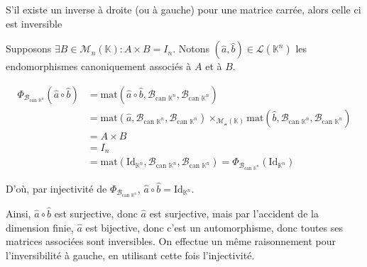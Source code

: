 \documentclass{article}
\date{1 Juillet 2024}
\begin{document}
\maketitle

\begin{question_kholle}
	[Soit $A \in \mathcal{M}_{n}(\mathbb{K})$
	\begin{itemize}
		\item S'il existe $B \in \mathcal{M}_{n}(\mathbb{K}):A\times B = I_{n}$, alors $A\in GL_{n}(\mathbb{K})$ et $A^{-1}=B$
		\item S'il existe $B \in \mathcal{M}_{n}(\mathbb{K}):B \times A = I_{n}$, alors $A\in GL_{n}(\mathbb{K})$ et $A^{-1}=B$
	\end{itemize}
	]
	{S'il existe un inverse à droite (ou à gauche) pour une matrice carrée, alors celle ci est inversible}
	
	
	Supposons $\exists B \in \mathcal{M}_{n}(\mathbb{K}):A\times B = I_{n}$. Notons $(\hat{a}, \hat{b}) \in \mathcal{L}(\mathbb{K}^{n})$ les endomorphismes canoniquement associés à $A$ et à $B$.
	
	
	\begin{align*}
		\Phi_{\mathcal{B}_{\text{can } \mathbb{K}^{n}}}(\hat{a} \circ \hat{b}) &= \mathrm{mat}(\hat{a} \circ  \hat{b}, \mathcal{B}_{\text{can } \mathbb{K}^{n}}, \mathcal{B}_{\text{can } \mathbb{K}^{n}}) \\
		&= \mathrm{mat}(\hat{a}, \mathcal{B}_{\text{can } \mathbb{K}^{n}}, \mathcal{B}_{\text{can } \mathbb{K}^{n}}) \times_{\mathcal{M_{n}(\mathbb{K})}} \mathrm{mat}(\hat{b}, \mathcal{B}_{\text{can } \mathbb{K}^{n}}, \mathcal{B}_{\text{can } \mathbb{K}^{n}}) \\
		&= A \times B \\
		&= I_{n} \\
		&= \mathrm{mat}(\mathrm{Id}_{\mathbb{K}^{n}}, \mathcal{B}_{\text{can } \mathbb{K}^{n}}, \mathcal{B}_{\text{can } \mathbb{K}^{n}}) = \Phi_{\mathcal{B}_{\text{can } \mathbb{K}^{n}}}(\mathrm{Id}_{\mathbb{K}^{n}})
	\end{align*}
	
	
	D'où, par injectivité de $\Phi_{\mathcal{B}_{\text{can } \mathbb{K}^{n}}}$, $\hat{a} \circ \hat{b} = \mathrm{Id}_{\mathbb{K}^{n}}$.
	
	Ainsi, $\hat{a} \circ \hat{b}$ est surjective, donc $\hat{a}$ est surjective, mais par l'accident de la dimension finie, $\hat{a}$ est bijective, donc c'est un automorphisme, donc toutes ses matrices associées sont inversibles. On effectue un même raisonnement pour l'inversibilité à gauche, en utilisant cette fois l'injectivité.
\end{question_kholle}
\end{document}
